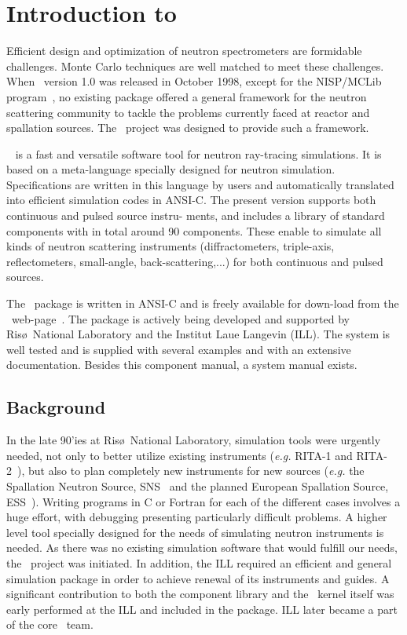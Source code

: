  
\chapter{Introduction to \MCX}

Efficient design and optimization of neutron spectrometers are
formidable challenges. Monte Carlo techniques are well matched to meet
these challenges. When \MCX\ version 1.0 was released in October
1998, except for the NISP/MCLib program~\cite{nisp_webpage}, no existing package offered a general framework for the neutron
scattering community to tackle the problems currently faced at reactor and
spallation sources. The \MCX\ project was designed to provide such a framework.

\MCX\ %
is a fast and versatile software tool for neutron ray-tracing simulations.
It is based on a meta-language specially designed for neutron
simulation. Specifications are written in this language by users and
automatically translated into efficient simulation codes in ANSI-C.
The present version supports both continuous and pulsed source instru-
ments, and includes a library of standard
components with in total around 90 components. These enable to simulate all kinds of neutron scattering instruments (diffractometers, triple-axis, reflectometers, small-angle, back-scattering,...) for both continuous and pulsed sources.

The \MCX\ package is written in ANSI-C and is freely available for down-load
from the \MCX\ web-page~\cite{mcstas_webpage}. The package is actively
being developed and supported by Ris\o\ National Laboratory 
and the Institut Laue Langevin (ILL). 
The system is well tested and
is supplied with several examples and with an extensive documentation.
Besides this component manual, a system manual exists.


\section{Background}

In the late 90'ies at Ris\o\ National Laboratory, 
simulation tools were urgently needed,
not only to better utilize existing instruments
({\em e.g.} RITA-1 and RITA-2~\cite{cjp_73_697,pb_241_50,pb_283_343}), 
but also to plan completely new instruments for new sources 
({\em e.g.} the Spallation Neutron Source, SNS~\cite{sns_webpage} 
and the planned European Spallation Source, ESS~\cite{ess_webpage}). 
Writing programs in C or Fortran for
each of the different cases involves a huge effort, with debugging presenting
particularly difficult problems. A higher level tool specially designed
for the needs of simulating neutron instruments is needed. As there was
no existing simulation software that would fulfill our needs, the \MCX\ 
project was initiated.
In addition, the ILL required an efficient and general simulation
package in order to achieve renewal of its instruments and guides. 
A significant contribution to both the component library and the \MCX\ 
kernel itself was early performed at the ILL and included in the package.
ILL later became a part of the core \MCX\ team.

